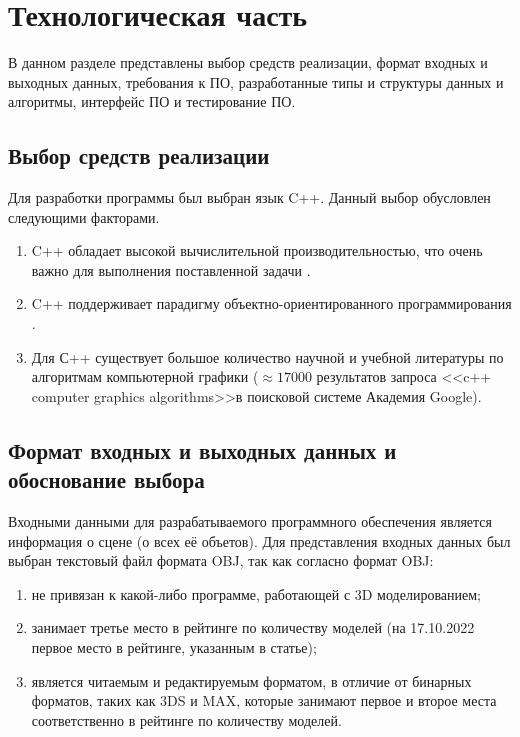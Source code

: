 \chapter{Технологическая часть}

В данном разделе представлены выбор средств реализации, формат входных и выходных данных, требования к ПО, разработанные типы и структуры данных и алгоритмы, интерфейс ПО и тестирование ПО.

\section{Выбор средств реализации}
Для разработки программы был выбран язык C++.  Данный выбор обусловлен следующими факторами.

\begin{enumerate}[label=\arabic*)]
	\item C++ обладает высокой вычислительной производительностью, что очень важно для выполнения поставленной задачи \cite{cplusplusperfomance}.
	\item C++ поддерживает парадигму объектно-ориентированного программирования \cite{isocplusplus}.
	\item Для С++ существует большое количество научной и учебной литературы по алгоритмам компьютерной графики ($\approx17000$ результатов запроса <<c++ computer graphics algorithms>>в поисковой системе Академия Google).
\end{enumerate}

\section{Формат входных и выходных данных и обоснование выбора}

Входными данными для разрабатываемого программного обеспечения является информация о сцене (о всех её объетов). Для представления входных данных был выбран текстовый файл формата OBJ, так как согласно \cite{3d} формат OBJ:
\begin{enumerate}[label=\arabic*)]
	\item не привязан к какой-либо программе, работающей с 3D моделированием;
	\item занимает третье место в рейтинге по количеству моделей (на 17.10.2022 первое место в рейтинге, указанным в статье);
	\item является читаемым и редактируемым форматом, в отличие от бинарных форматов, таких как 3DS и MAX, которые занимают первое и второе места соответственно в рейтинге по количеству моделей.
\end{enumerate}

